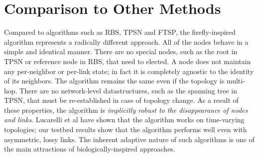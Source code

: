 \section{Comparison to Other Methods}

Compared to algorithms such as RBS, TPSN and FTSP\cite{rbs,ftsp,tpsn},
the firefly-inspired algorithm represents a radically different
approach. All of the nodes behave in a simple and identical
manner. There are no special nodes, such as the root in TPSN or
reference node in RBS, that need to elected. A node does not maintain
any per-neighbor or per-link state; in fact it is completely agnostic
to the identity of its neighbors. The algorithm remains the same even
if the topology is multi-hop. There are no network-level
datastructures, such as the spanning tree in TPSN, that must be
re-established in case of topology change. As a result of these
properties, the algorithm is {\em implicitly robust to the
disappearance of nodes and links}. Lucarelli et al \cite{lucarelli04}
have shown that the algorithm works on time-varying topologies; our
testbed results show that the algorithm performs well even with
asymmetric, lossy links. The inherent adaptive nature of such
algorithms is one of the main attractions of biologically-inspired
approaches.


